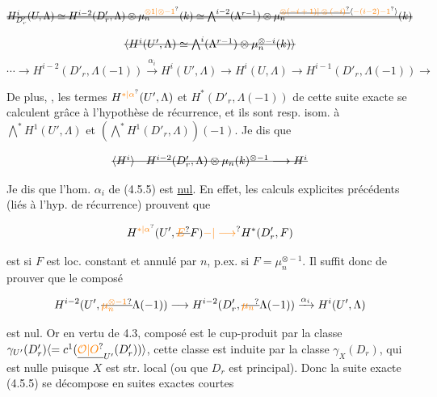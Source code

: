 
\[
\deleted{\deleted{H^i_{D'_r}(U,\Lambda)\simeq H^{i-2}(D'_r,\Lambda)\otimes\mu_n^{\unsure{\otimes1|\otimes-1}}(k)\simeq\bigwedge^{i-2}(\Lambda^{r-1})\otimes\mu_n^{\deleted{\unsure{\otimes(-i+1)|\otimes(-i)}}\inserted{\unsure{-(i-2)-1}}}(k)}}
\]

\[
\deleted{\inserted{H^i(U',\Lambda)\simeq\bigwedge^i(\Lambda^{r-1})\otimes\mu_n^{\otimes-i}(k)}}
\]
\[
\cdots\longrightarrow H^{i-2}(D'_r,\Lambda(-1))\xrightarrow{\alpha_i}H^i(U',\Lambda)\longrightarrow H^i(U,\Lambda)\longrightarrow H^{i-1}(D'_r,\Lambda(-1))\longrightarrow
\tag*{(4.5.5)}
\]

De plus, , les termes $H^{\unsure{*|\alpha}}(U',\Lambda)$ et $H^*(D'_r,\Lambda(-1))$ de cette suite exacte se calculent grâce à l'hypothèse de récurrence, et ils sont resp. isom. à $\bigwedge^*H^1(U',\Lambda)$ et $(\bigwedge^*H^1(D'_r,\Lambda))(-1)$. Je dis que

\[
\deleted{\inserted{H^i}\quad H^{i-2}(D'_r,\Lambda)\otimes\mu_n(k)^{\otimes-1}\longrightarrow H^i}
\]

 Je dis que l'hom. $\alpha_i$ de (4.5.5) est \uline{nul}. En effet, les calculs explicites précédents (liés à l'hyp. de récurrence) prouvent que

\[
H^{\unsure{*|\alpha}}(U',\deleted{\unsure{E}}F)\unsure{{-}|\longrightarrow}H^*(D'_r,F)
\]

est   si $F$ est loc. constant et annulé par $n$, p.ex. si $F=\mu_n^{\otimes-1}$. Il suffit donc de prouver que le composé

\[
H^{i-2}(U',\deleted{\unsure{\mu_n^{\otimes-1}}}\Lambda(-1))\longrightarrow H^{i-2}(D'_r,\deleted{\unsure{\mu_n}}\Lambda(-1))\xrightarrow{\alpha_i}H^i(U',\Lambda)
\]

est nul. Or en vertu de 4.3,  composé est le cup-produit par la classe  $\gamma_{U'}(D'_r)\inserted{=c^1(\underline{\unsure{\mathcal O|O}}_{U'}(D'_r))}$,  cette classe est induite par la classe  $\gamma_X(D_r)$, qui est nulle puisque $X$ est str. local (ou  que $D_r$ est principal). Donc la suite exacte (4.5.5) se décompose en suites exactes courtes

